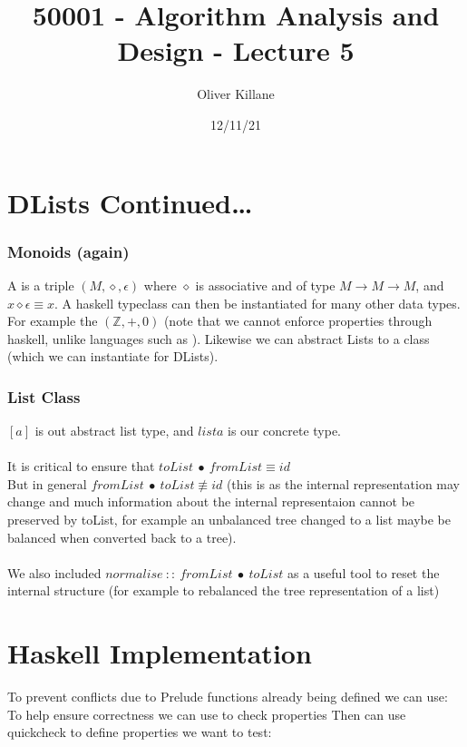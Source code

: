 \documentclass{report}
\title{50001 - Algorithm Analysis and Design - Lecture 5}
\author{Oliver Killane}
\date{12/11/21}
\begin{document}
    \maketitle

    \section*{DLists Continued\dots}
        \subsubsection*{Monoids (again)}
            A  is a triple $(M, \diamond, \epsilon)$ where $\diamond$ is associative and of type $M \to M \to M$, and $x \diamond \epsilon \equiv x$.
            A haskell typeclass can then be instantiated for many other data types. For example the  $(\mathbb{Z}, +, 0)$ (note that we cannot enforce  properties through haskell, unlike languages such as ).
            Likewise we can abstract Lists to a class (which we can instantiate for DLists).
        
        \subsubsection*{List Class}
            $[a]$ is out abstract list type, and $list a$ is our concrete type.
            \\
            \\ It is critical to ensure that $toList \ \bullet \ fromList \equiv id$
            \\ But in general $fromList \ \bullet \ toList \not\equiv id$ (this is as the internal representation may change 
            and much information about the internal representaion cannot be preserved by toList, for example an unbalanced tree 
            changed to a list maybe be balanced when converted back to a tree).
            \\
            \\ We also included $normalise \ :: \ fromList \ \bullet \ toList$ as a useful tool to reset the internal structure (for example to rebalanced the tree representation of a list)
    
    \section*{Haskell Implementation}
        To prevent conflicts due to Prelude functions already being defined we can use:
        To help ensure correctness we can use  to check properties
        Then can use quickcheck to define properties we want to test:
\end{document}
